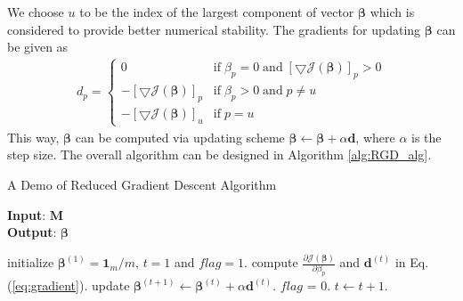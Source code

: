 \documentclass{article}
\begin{document}
We choose $u$ to be the index of the largest component of vector $\boldsymbol{\beta}$ which is considered to provide better numerical stability.
The gradients for updating $\boldsymbol{\beta}$ can be given as 
\begin{equation}\label{eq:gradient}
	\begin{split}
		d_p = \left\{
			\begin{array}{ll}
			0	&	\mathrm{if}\; \beta_p=0\; \mathrm{and}\; [\bigtriangledown \mathcal{J}(\boldsymbol{\beta})]_p > 0\\
			- [\bigtriangledown \mathcal{J}(\boldsymbol{\beta})]_p  &  \mathrm{if}\; \beta_p>0\; \mathrm{and}\; p\neq u\\
			- [\bigtriangledown \mathcal{J}(\boldsymbol{\beta})]_u  &  \mathrm{if}\; p=u
			\end{array} \right.
	\end{split}
\end{equation}
This way, $\boldsymbol{\beta}$ can be computed via updating scheme $\boldsymbol{\beta} \leftarrow \boldsymbol{\beta} + \alpha \mathbf{d}$, where $\alpha$ is the step size.
The overall algorithm can be designed in Algorithm \ref{alg:RGD_alg}.


\begin{algorithm}[h]
\caption{A Demo of Reduced Gradient Descent Algorithm}
\label{alg:RGD_alg}
\textbf{Input}: $\mathbf{M}$\\
\textbf{Output}: $\boldsymbol{\beta}$
\begin{algorithmic}[1] %
\STATE initialize $\boldsymbol{\beta}^{(1)}=\mathbf{1}_m/m$, $t=1$ and $flag=1$.
  \STATE compute $\frac{\partial \mathcal{J}(\boldsymbol{\beta})}{\partial \beta_p}$ and $\mathbf{d}^{(t)}$ in Eq. (\ref{eq:gradient}).
  \STATE update $\boldsymbol{\beta}^{(t+1)} \leftarrow \boldsymbol{\beta}^{(t)} + \alpha \mathbf{d}^{(t)}$.
  		\STATE $flag$ = 0.
  \ENDIF
  \STATE $t \leftarrow t+1$.
\ENDWHILE
\end{algorithmic}
\end{algorithm}




\clearpage





\end{document}
